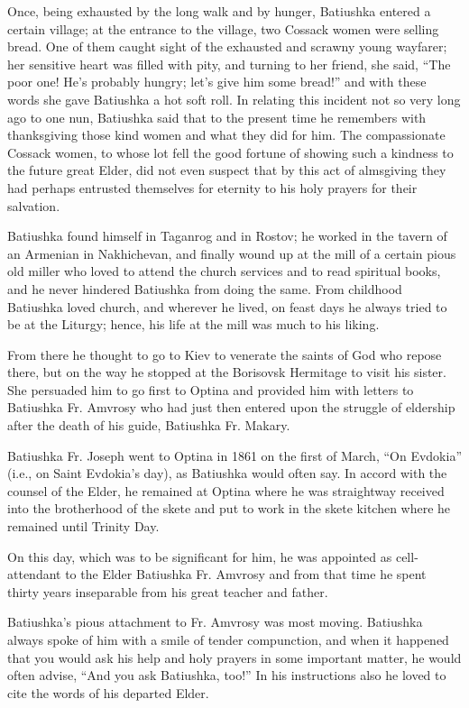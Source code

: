 Once, being exhausted by the long walk and by hunger, Batiushka entered a certain village; at the entrance to the village, two Cossack women were selling bread. One of them caught sight of the exhausted and scrawny young wayfarer; her sensitive heart was filled with pity, and turning to her friend, she said, ``The poor one! He's probably hungry; let's give him some bread!'' and with these words she gave Batiushka a hot soft roll. In relating this incident not so very long ago to one nun, Batiushka said that to the present time he remembers with thanksgiving those kind women and what they did for him. The compassionate Cossack women, to whose lot fell the good fortune of showing such a kindness to the future great Elder, did not even suspect that by this act of almsgiving they had perhaps entrusted themselves for eternity to his holy prayers for their salvation.

Batiushka found himself in Taganrog and in Rostov; he worked in the tavern of an Armenian in Nakhichevan, and finally wound up at the mill of a certain pious old miller who loved to attend the church services and to read spiritual books, and he never hindered Batiushka from doing the same. From childhood Batiushka loved church, and wherever he lived, on feast days he always tried to be at the Liturgy; hence, his life at the mill was much to his liking.

From there he thought to go to Kiev to venerate the saints of God who repose there, but on the way he stopped at the Borisovsk Hermitage to visit his sister. She persuaded him to go first to Optina and provided him with letters to Batiushka Fr. Amvrosy who had just then entered upon the struggle of eldership after the death of his guide, Batiushka Fr. Makary.

Batiushka Fr. Joseph went to Optina in 1861 on the first of March, ``On Evdokia'' (i.e., on Saint Evdokia's day), as Batiushka would often say. In accord with the counsel of the Elder, he remained at Optina where he was straightway received into the brotherhood of the skete and put to work in the skete kitchen where he remained until Trinity Day.

On this day, which was to be significant for him, he was appointed as cell-attendant to the Elder Batiushka Fr. Amvrosy and from that time he spent thirty years inseparable from his great teacher and father.

Batiushka's pious attachment to Fr. Amvrosy was most moving. Batiushka always spoke of him with a smile of tender compunction, and when it happened that you would ask his help and holy prayers in some important matter, he would often advise, ``And you ask Batiushka, too!'' In his instructions also he loved to cite the words of his departed Elder.

